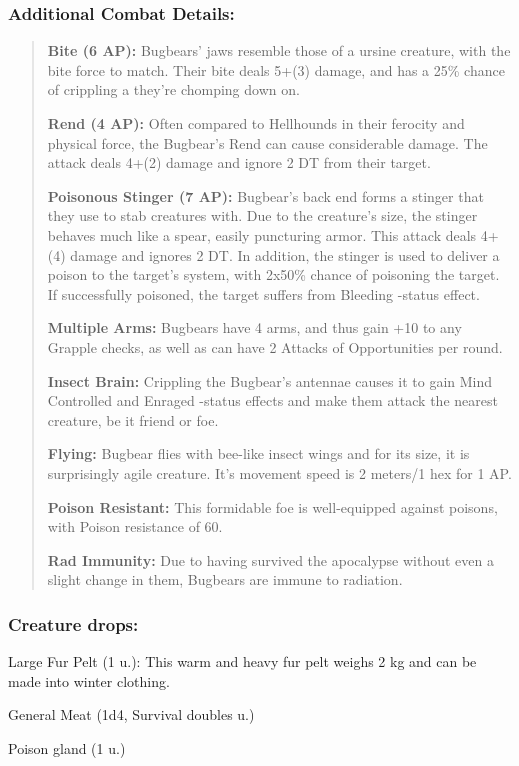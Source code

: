 \documentclass[11pt,a4paper,twocolumn]{book}
\begin{document}
	\subsubsection*{Additional Combat Details:}
	\begin{verse}
		\textbf{Bite (6 AP):} Bugbears' jaws resemble those of a ursine creature, with the bite force to match. Their bite deals 5+(3) damage, and has a 25\% chance of crippling a they're chomping down on.
		
		\textbf{Rend (4 AP):} Often compared to Hellhounds in their ferocity and physical force, the Bugbear's Rend can cause considerable damage. The attack deals 4+(2) damage and ignore 2 DT from their target.
		
		\textbf{Poisonous Stinger (7 AP):} Bugbear's back end forms a stinger that they use to stab creatures with. Due to the creature's size, the stinger behaves much like a spear, easily puncturing armor. This attack deals 4+(4) damage and ignores 2 DT. In addition, the stinger is used to deliver a poison to the target's system, with 2x50\% chance of poisoning the target. If successfully poisoned, the target suffers from Bleeding -status effect.
		
		\textbf{Multiple Arms:} Bugbears have 4 arms, and thus gain +10 to any Grapple checks, as well as can have 2 Attacks of Opportunities per round.
		
		\textbf{Insect Brain:} Crippling the Bugbear's antennae causes it to gain Mind Controlled and Enraged -status effects and make them attack the nearest creature, be it friend or foe.
		
		\textbf{Flying:} Bugbear flies with bee-like insect wings and for its size, it is surprisingly agile creature. It's movement speed is 2 meters/1 hex for 1 AP.
		
		\textbf{Poison Resistant:} This formidable foe is well-equipped against poisons, with Poison resistance of 60.
		
		\textbf{Rad Immunity:} Due to having survived the apocalypse without even a slight change in them, Bugbears are immune to radiation.
		
	\end{verse}
	
	\subsubsection*{Creature drops:}
	\begin{compactitem}
		\item Large Fur Pelt (1 u.): This warm and heavy fur pelt weighs 2 kg and can be made into winter clothing.
		\item General Meat (1d4, Survival doubles u.)
		\item Poison gland (1 u.)
	\end{compactitem}
	
\end{document}
